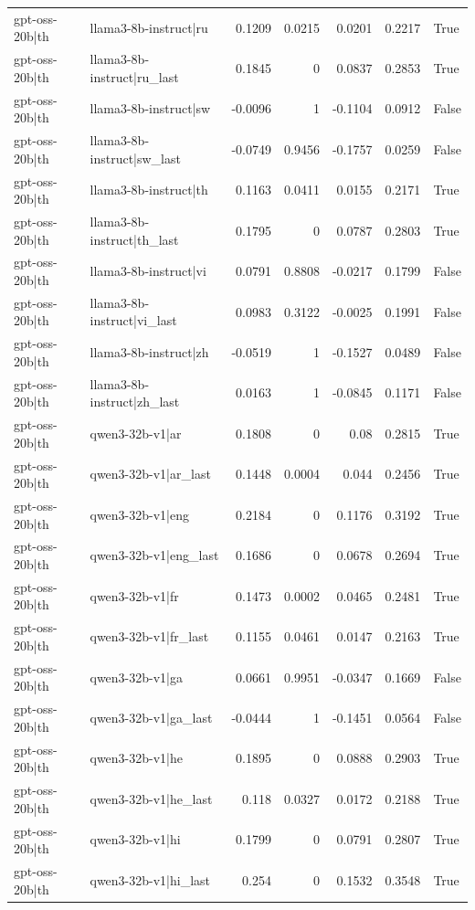 \begin{table}
\begin{tabular}{l l r r r r l}
gpt-oss-20b|th & llama3-8b-instruct|ru & 0.1209 & 0.0215 & 0.0201 & 0.2217 & True \\
gpt-oss-20b|th & llama3-8b-instruct|ru_last & 0.1845 & 0 & 0.0837 & 0.2853 & True \\
gpt-oss-20b|th & llama3-8b-instruct|sw & -0.0096 & 1 & -0.1104 & 0.0912 & False \\
gpt-oss-20b|th & llama3-8b-instruct|sw_last & -0.0749 & 0.9456 & -0.1757 & 0.0259 & False \\
gpt-oss-20b|th & llama3-8b-instruct|th & 0.1163 & 0.0411 & 0.0155 & 0.2171 & True \\
gpt-oss-20b|th & llama3-8b-instruct|th_last & 0.1795 & 0 & 0.0787 & 0.2803 & True \\
gpt-oss-20b|th & llama3-8b-instruct|vi & 0.0791 & 0.8808 & -0.0217 & 0.1799 & False \\
gpt-oss-20b|th & llama3-8b-instruct|vi_last & 0.0983 & 0.3122 & -0.0025 & 0.1991 & False \\
gpt-oss-20b|th & llama3-8b-instruct|zh & -0.0519 & 1 & -0.1527 & 0.0489 & False \\
gpt-oss-20b|th & llama3-8b-instruct|zh_last & 0.0163 & 1 & -0.0845 & 0.1171 & False \\
gpt-oss-20b|th & qwen3-32b-v1|ar & 0.1808 & 0 & 0.08 & 0.2815 & True \\
gpt-oss-20b|th & qwen3-32b-v1|ar_last & 0.1448 & 0.0004 & 0.044 & 0.2456 & True \\
gpt-oss-20b|th & qwen3-32b-v1|eng & 0.2184 & 0 & 0.1176 & 0.3192 & True \\
gpt-oss-20b|th & qwen3-32b-v1|eng_last & 0.1686 & 0 & 0.0678 & 0.2694 & True \\
gpt-oss-20b|th & qwen3-32b-v1|fr & 0.1473 & 0.0002 & 0.0465 & 0.2481 & True \\
gpt-oss-20b|th & qwen3-32b-v1|fr_last & 0.1155 & 0.0461 & 0.0147 & 0.2163 & True \\
gpt-oss-20b|th & qwen3-32b-v1|ga & 0.0661 & 0.9951 & -0.0347 & 0.1669 & False \\
gpt-oss-20b|th & qwen3-32b-v1|ga_last & -0.0444 & 1 & -0.1451 & 0.0564 & False \\
gpt-oss-20b|th & qwen3-32b-v1|he & 0.1895 & 0 & 0.0888 & 0.2903 & True \\
gpt-oss-20b|th & qwen3-32b-v1|he_last & 0.118 & 0.0327 & 0.0172 & 0.2188 & True \\
gpt-oss-20b|th & qwen3-32b-v1|hi & 0.1799 & 0 & 0.0791 & 0.2807 & True \\
gpt-oss-20b|th & qwen3-32b-v1|hi_last & 0.254 & 0 & 0.1532 & 0.3548 & True \\

\end{tabular}
\end{table}
